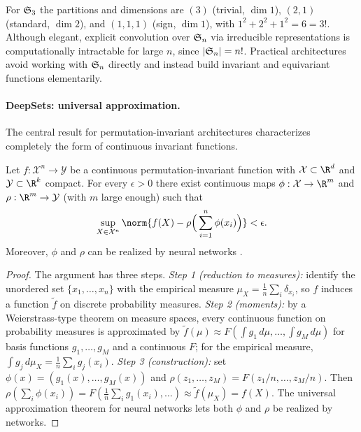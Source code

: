For $\mathfrak{S}_3$ the partitions and dimensions are $(3)$ (trivial, $\dim 1$), $(2,1)$
(standard, $\dim 2$), and $(1,1,1)$ (sign, $\dim 1$), with $1^2 + 2^2 + 1^2 = 6 =
3!$. Although elegant, explicit convolution over $\mathfrak{S}_n$ via irreducible
representations is computationally intractable for large $n$, since $|\mathfrak{S}_n| =
n!$. Practical architectures avoid working with $\mathfrak{S}_n$ directly and instead
build invariant and equivariant functions elementarily.

\paragraph{DeepSets: universal approximation.}
The central result for permutation-invariant architectures characterizes
completely the form of continuous invariant functions.

\begin{theorem}
\label{thm:groups:deepsets}
Let $f: \mathcal{X}^n \to \mathcal{Y}$ be a continuous permutation-invariant
function with $\mathcal{X} \subset \R^d$ and $\mathcal{Y} \subset \R^k$ compact.
For every $\epsilon > 0$ there exist continuous maps $\phi: \mathcal{X} \to \R^m$
and $\rho: \R^m \to \mathcal{Y}$ (with $m$ large enough) such that
\begin{equation}
  \sup_{X \in \mathcal{X}^n}
    \norm{f(X) - \rho\Big(\sum_{i=1}^n \phi(x_i)\Big)} < \epsilon.
  \label{eq:groups:deepsets}
\end{equation}
Moreover, $\phi$ and $\rho$ can be realized by neural networks
\citep{zaheer2017deepsets}.
\end{theorem}

\begin{proof}
The argument has three steps. \emph{Step 1 (reduction to measures):} identify the
unordered set $\{x_1, \dots, x_n\}$ with the empirical measure $\mu_X =
\tfrac{1}{n}\sum_i \delta_{x_i}$, so $f$ induces a function $\tilde f$ on discrete
probability measures. \emph{Step 2 (moments):} by a Weierstrass-type theorem on
measure spaces, every continuous function on probability measures is approximated
by $\tilde f(\mu) \approx F(\int g_1\, d\mu, \dots, \int g_M\, d\mu)$ for basis
functions $g_1, \dots, g_M$ and a continuous $F$; for the empirical measure,
$\int g_j\, d\mu_X = \tfrac{1}{n}\sum_i g_j(x_i)$. \emph{Step 3 (construction):}
set $\phi(x) = (g_1(x), \dots, g_M(x))$ and $\rho(z_1, \dots, z_M) = F(z_1/n,
\dots, z_M/n)$. Then $\rho(\sum_i \phi(x_i)) = F(\tfrac1n\sum_i g_1(x_i), \dots)
\approx \tilde f(\mu_X) = f(X)$. The universal approximation theorem for neural
networks lets both $\phi$ and $\rho$ be realized by networks.
\end{proof}

